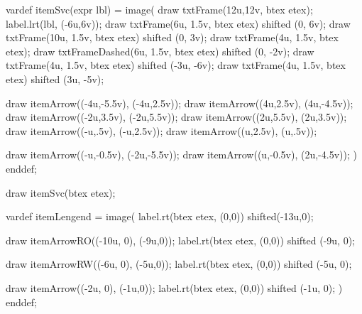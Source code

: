 


vardef itemSvc(expr lbl) =
image(
	draw txtFrame(12u,12v, btex \mplabel{} etex);
	label.lrt(lbl, (-6u,6v));
	draw txtFrame(6u, 1.5v, btex  etex) shifted (0, 6v);
	draw txtFrame(10u, 1.5v, btex  etex) shifted (0, 3v);
	draw txtFrame(4u, 1.5v, btex  etex);
	draw txtFrameDashed(6u, 1.5v, btex  etex) shifted (0, -2v);
	draw txtFrame(4u, 1.5v, btex  etex) shifted (-3u, -6v);
	draw txtFrame(4u, 1.5v, btex  etex) shifted (3u, -5v);

	draw itemArrow((-4u,-5.5v), (-4u,2.5v));	%
	draw itemArrow((4u,2.5v), (4u,-4.5v));		%
	draw itemArrow((-2u,3.5v), (-2u,5.5v));		%
	draw itemArrow((2u,5.5v), (2u,3.5v));		%
	draw itemArrow((-u,.5v), (-u,2.5v));		%
	draw itemArrow((u,2.5v), (u,.5v));		%

	draw itemArrow((-u,-0.5v), (-2u,-5.5v));	%
	draw itemArrow((u,-0.5v), (2u,-4.5v));		%
)
enddef;


draw itemSvc(btex  etex);

vardef itemLengend =
image(
	label.rt(btex  etex, (0,0)) shifted(-13u,0);

	draw itemArrowRO((-10u, 0), (-9u,0));
	label.rt(btex  etex, (0,0)) shifted (-9u, 0);

	draw itemArrowRW((-6u, 0), (-5u,0));
	label.rt(btex  etex, (0,0)) shifted (-5u, 0);

	draw itemArrow((-2u, 0), (-1u,0));
	label.rt(btex  etex, (0,0)) shifted (-1u, 0);
)
enddef;


\stopreusableMPgraphic

